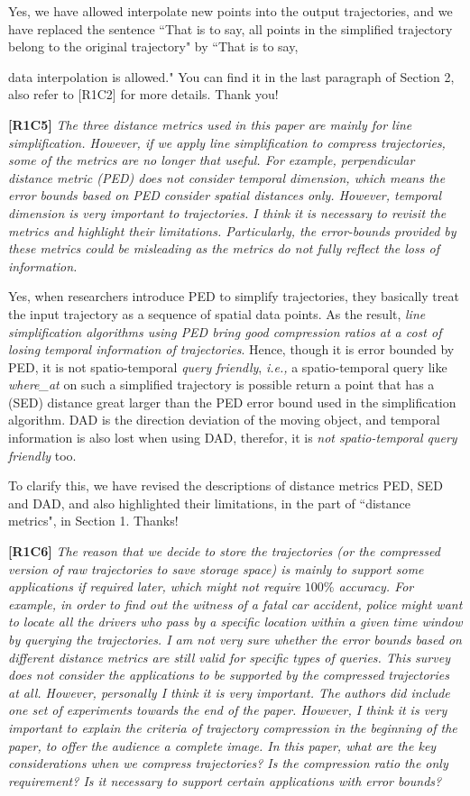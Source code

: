 \documentclass{letter}
\newcommand{\ie}{\emph{i.e.,}\xspace}
\begin{document}
Yes, we have allowed interpolate new points into the output trajectories, and we have replaced the sentence ``That is to say, all points in the simplified trajectory belong to the original trajectory" by ``That is to say, {data interpolation is allowed." You can find it in the last paragraph of Section 2, also refer to [R1C2] for more details. Thank you!


\textbf{[R1C5]} \emph{The three distance metrics used in this paper are mainly for line simplification. However, if we apply line simplification to compress trajectories, some of the metrics are no longer that useful. For example, perpendicular distance metric (PED) does not consider temporal dimension, which means the error bounds based on PED consider spatial distances only. However, temporal dimension is very important to trajectories. I think it is necessary to revisit the metrics and highlight their limitations. Particularly, the error-bounds provided by these metrics could be misleading as the metrics do not fully reflect the loss of information. }

Yes, when researchers introduce PED to simplify trajectories, they basically treat the input trajectory as a sequence of spatial data points. As the result, \emph{line simplification algorithms using PED bring good compression ratios at a cost of losing temporal information of trajectories}. Hence, though it is error bounded by PED, it is not spatio-temporal \emph{query friendly}, \ie a spatio-temporal query like \emph{where\_at} on such a simplified trajectory is possible return a point that has a (SED) distance great larger than the PED error bound used in the simplification algorithm. DAD is the direction deviation of the moving object, and 
temporal information is also lost when using DAD, therefor, it is \emph{not spatio-temporal query friendly} too.

To clarify this, we have revised the descriptions of distance metrics PED, SED and DAD, and also highlighted their limitations, in the part of ``distance metrics", in Section 1. Thanks!

\textbf{[R1C6]} \emph{ The reason that we decide to store the trajectories (or the compressed version of raw trajectories to save storage space) is mainly to support some applications if required later, which might not require $100\%$ accuracy. For example, in order to find out the witness of a fatal car accident, police might want to locate all the drivers who pass by a specific location within a given time window by querying the trajectories. I am not very sure whether the error bounds based on different distance metrics are still valid for specific types of queries. {This survey does not consider the applications to be supported by the compressed trajectories at all. However, personally I think it is very important.} The authors did include one set of experiments towards the end of the paper. However, I think it is very important to explain the criteria of trajectory compression in the beginning of the paper, to offer the audience a complete image. In this paper, what are the key considerations when we compress trajectories? Is the compression ratio the only requirement? Is it necessary to support certain applications with error bounds? }

}
\end{document}
